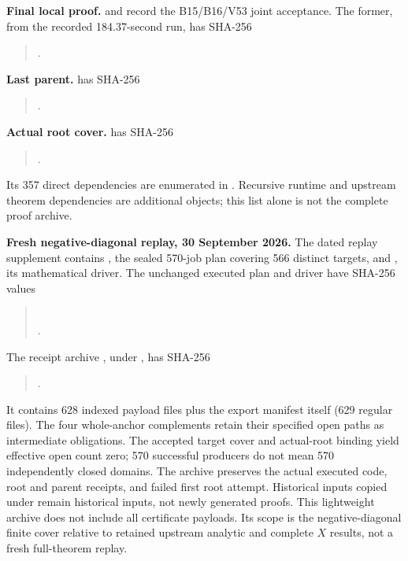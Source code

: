 \documentclass[10pt]{article}
\begin{document}
\textbf{Final local proof.}
 and
 record the B15/B16/V53
joint acceptance. The former, from the recorded 184.37-second run,
has SHA-256
\begin{quote}
.
\end{quote}
\textbf{Last parent.}
 has SHA-256
\begin{quote}
.
\end{quote}
\textbf{Actual root cover.}
 has SHA-256
\begin{quote}
.
\end{quote}
Its 357 direct dependencies are enumerated in
. Recursive runtime and
upstream theorem dependencies are additional objects; this list alone
is not the complete proof archive.

\textbf{Fresh negative-diagonal replay, 30 September 2026.}
The dated replay supplement contains
,
the sealed 570-job plan covering 566 distinct targets, and
, its mathematical driver.
The unchanged executed plan and driver have SHA-256 values
\begin{quote}\small
{}\\
.
\end{quote}
The receipt archive ,
under , has SHA-256
\begin{quote}\small
{}.
\end{quote}
It contains 628 indexed payload files plus the export manifest itself
(629 regular files).  The four whole-anchor complements retain their
specified open paths as intermediate obligations.  The accepted target
cover and actual-root binding yield effective open count zero;
570 successful producers do not mean 570 independently closed domains.
The archive preserves the actual executed code, root and parent
receipts, and failed first root attempt.  Historical inputs copied under
 remain historical inputs, not newly generated proofs.
This lightweight archive does not include all certificate payloads.
Its scope is the negative-diagonal finite cover relative to retained
upstream analytic and complete \(X\) results, not a fresh full-theorem replay.
\end{document}
